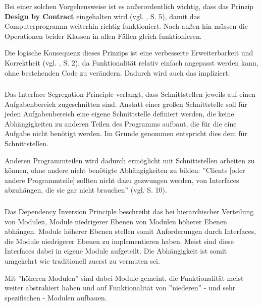 Bei einer solchen Vorgehensweise ist es außerordentlich wichtig, dass das Prinzip \textbf{Design by Contract} eingehalten wird (vgl. \cite{goll2014architektur}, S. 5), damit das Computerprogramm weiterhin richtig funktioniert. Nach außen hin müssen die Operationen beider Klassen in allen Fällen gleich funktionieren.

Die logische Konsequenz dieses Prinzips ist eine verbesserte Erweiterbarkeit und Korrektheit (vgl. \cite{itDesignersSOLID}, S. 2), da Funktionalität relativ einfach angepasst werden kann, ohne bestehenden Code zu verändern. 
Dadurch wird auch das  impliziert.


\subsubsection{\textPrincipleInterfaceSegregation}
\label{\textPrincipleInterfaceSegregation}
Das Interface Segregation Principle verlangt, dass Schnittstellen jeweils auf einen Aufgabenbereich zugeschnitten sind.
Anstatt einer großen Schnittstelle soll für jeden Aufgabenbereich eine eigene
Schnittstelle definiert werden, die keine Abhängigkeiten zu anderen Teilen des Programms 
aufbaut, die für die eine Aufgabe nicht benötigt werden.
Im Grunde genommen entspricht dies dem   für Schnittstellen.

Anderen Programmteilen wird dadurch ermöglicht mit Schnittstellen arbeiten zu können, ohne andere nicht benötigte Abhängigkeiten zu bilden: ''Clients [oder andere Programmteile] sollten nicht dazu gezwungen werden, von Interfaces abzuhängen, die sie gar nicht brauchen'' (vgl. \cite{goll2014architektur} S. 10).


\subsubsection{\textPrincipleDependencyInversion}
\label{\textPrincipleDependencyInversion}
Das Dependency Inversion Principle beschreibt das bei hierarchischer Verteilung von Modulen,
Module niedrigerer Ebenen von Modulen höherer Ebenen abhängen.
Module höherer Ebenen stellen somit Anforderungen durch Interfaces, die Module niedrigerer Ebenen zu implementieren haben.
Meist sind diese Interfaces dabei in eigene Module aufgeteilt. Die Abhängigkeit ist somit umgekehrt wie traditionell
zuerst zu vermuten sei.

Mit ''höheren Modulen'' sind dabei Module gemeint, die Funktionalität meist weiter abstrahiert haben und auf 
Funktionalität von ''niederen'' - und sehr spezifischen - Modulen aufbauen.
